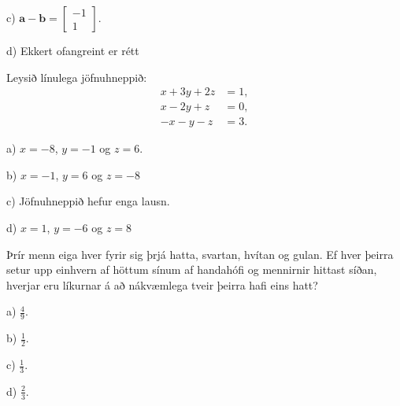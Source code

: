c) $ \mathbf{a} - \mathbf{b} = \left[  \begin{matrix} -1\\ 1 \end{matrix} \right] $. %

d) Ekkert ofangreint er rétt


\item Leysið línulega jöfnuhneppið:
\begin{align*}
x + 3y + 2z &= 1, \\
x - 2y + z &= 0, \\
-x - y - z &= 3.
\end{align*}

a) $x = -8$, $y = -1$ og $z = 6$. %

b) $x = -1$, $y = 6$ og $z = -8$

c) Jöfnuhneppið hefur enga lausn.

d) $x = 1$, $y = -6$ og $z = 8$


\item Þrír menn eiga hver fyrir sig þrjá hatta, svartan, hvítan og gulan. Ef hver þeirra setur upp einhvern af höttum sínum af handahófi og mennirnir hittast síðan, hverjar eru líkurnar á að nákvæmlega tveir þeirra hafi eins hatt?

a) $ \frac{4}{9}$.

b) $ \frac{1}{2}$.

c) $ \frac{1}{3}$.

d) $ \frac{2}{3}$. %


